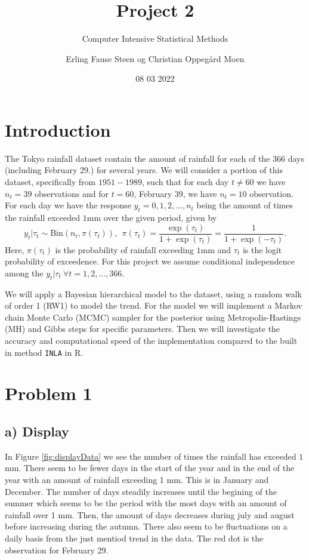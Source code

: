 \documentclass[
]{article}
\title{Project 2}
\subtitle{Computer Intensive Statistical Methods}
\author{Erling Fause Steen og Christian Oppegård Moen}
\date{08 03 2022}
\begin{document}
\maketitle

{
\hypersetup{linkcolor=}
\setcounter{tocdepth}{3}
\tableofcontents
}
\hypertarget{introduction}{%
\section{Introduction}\label{introduction}}

The Tokyo rainfall dataset contain the amount of rainfall for each of the \(366\) days (including February 29.) for several years. We will consider a portion of this dataset, specifically from \(1951-1989\), such that for each day \(t\neq 60\) we have \(n_t=39\) observations and for \(t=60\), February 39, we have \(n_t=10\) observation. For each day we have the response \(y_t = 0,1,2,...,n_t\) being the amount of times the rainfall exceeded \(1\)mm over the given period, given by
\begin{equation}\label{eq:1response}
  y_t | \tau_t \sim \text{Bin}(n_t,\pi (\tau _t)), \ \ \pi(\tau_t)=\frac{\exp(\tau_t)}{1+\exp(\tau_t)}=\frac{1}{1+\exp(-\tau_t)}.
\end{equation}
Here, \(\pi(\tau_t)\) is the probability of rainfall exceeding \(1\)mm and \(\tau_t\) is the logit probability of exceedence. For this project we assume conditional independence among the \(y_t|\tau_t \ \forall t=1,2,...,366\).

We will apply a Bayesian hierarchical model to the dataset, using a random walk of order 1 (RW1) to model the trend. For the model we will implement a Markov chain Monte Carlo (MCMC) sampler for the posterior using Metropolis-Hastings (MH) and Gibbs steps for specific parameters. Then we will investigate the accuracy and computational speed of the implementation compared to the built in method \texttt{INLA} in R.

\hypertarget{problem-1}{%
\section{Problem 1}\label{problem-1}}

\hypertarget{a-display}{%
\subsection{a) Display}\label{a-display}}

In Figure \ref{fig:displayData} we see the number of times the rainfall has exceeded \(1\)mm. There seem to be fewer days in the start of the year and in the end of the year with an amount of rainfall exceeding 1 mm. This is in January and December. The number of days steadily increases until the begining of the summer which seems to be the period with the most days with an amount of rainfall over 1 mm. Then, the amount of days decreases during july and august before increasing during the autumn. There also seem to be fluctuations on a daily basis from the just mentiod trend in the data. The red dot is the observation for February 29.
\end{document}
